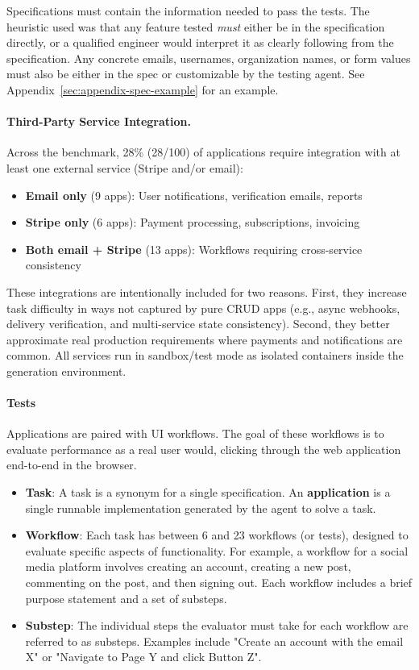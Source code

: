 Specifications must contain the information needed to pass the tests. The heuristic used was that any feature tested \textit{must} either be in the specification directly, or a qualified engineer would interpret it as clearly following from the specification. Any concrete emails, usernames, organization names, or form values must also be either in the spec or customizable by the testing agent. See Appendix~\ref{sec:appendix-spec-example} for an example.

\paragraph{Third-Party Service Integration.}
Across the benchmark, 28\% (28/100) of applications require integration with at least one external service (Stripe and/or email):
\begin{itemize}
    \item \textbf{Email only} (9 apps): User notifications, verification emails, reports
    \item \textbf{Stripe only} (6 apps): Payment processing, subscriptions, invoicing
    \item \textbf{Both email + Stripe} (13 apps): Workflows requiring cross-service consistency
\end{itemize}


These integrations are intentionally included for two reasons. First, they increase task difficulty in ways not captured by pure CRUD apps (e.g., async webhooks, delivery verification, and multi-service state consistency). Second, they better approximate real production requirements where payments and notifications are common. All services run in sandbox/test mode as isolated containers inside the generation environment.


\paragraph{Tests}
Applications are paired with UI workflows. The goal of these workflows is to evaluate performance as a real user would, clicking through the web application end-to-end in the browser.

\begin{itemize}
    \item \textbf{Task}: A task is a synonym for a single specification. An \textbf{application} is a single runnable implementation generated by the agent to solve a task.
    \item \textbf{Workflow}: Each task has between 6 and 23 workflows (or tests), designed to evaluate specific aspects of functionality. For example, a workflow for a social media platform involves creating an account, creating a new post, commenting on the post, and then signing out. Each workflow includes a brief purpose statement and a set of substeps.
    \item \textbf{Substep}: The individual steps the evaluator must take for each workflow are referred to as substeps. Examples include "Create an account with the email X" or "Navigate to Page Y and click Button Z".
\end{itemize}

